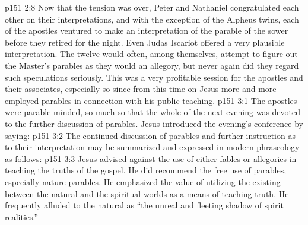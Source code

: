 \vs p151 2:8 Now that the tension was over, Peter and Nathaniel congratulated each other on their interpretations, and with the exception of the Alpheus twins, each of the apostles ventured to make an interpretation of the parable of the sower before they retired for the night. Even Judas Iscariot offered a very plausible interpretation. The twelve would often, among themselves, attempt to figure out the Master’s parables as they would an allegory, but never again did they regard such speculations seriously. This was a very profitable session for the apostles and their associates, especially so since from this time on Jesus more and more employed parables in connection with his public teaching.
\vs p151 3:1 The apostles were parable\hyp{}minded, so much so that the whole of the next evening was devoted to the further discussion of parables. Jesus introduced the evening’s conference by saying: 
\vs p151 3:2 \pc The continued discussion of parables and further instruction as to their interpretation may be summarized and expressed in modern phraseology as follows:
\vs p151 3:3 \bibnobreakspace Jesus advised against the use of either fables or allegories in teaching the truths of the gospel. He did recommend the free use of parables, especially nature parables. He emphasized the value of utilizing the  existing between the natural and the spiritual worlds as a means of teaching truth. He frequently alluded to the natural as “the unreal and fleeting shadow of spirit realities.”
